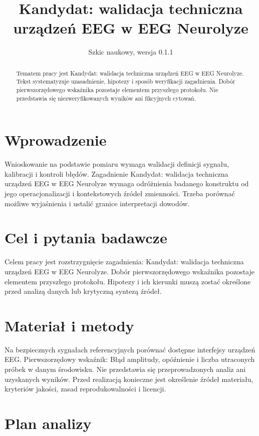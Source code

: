 \documentclass[11pt,a4paper]{article}
\title{Kandydat: walidacja techniczna urządzeń EEG w EEG Neurolyze}
\author{}
\date{Szkic naukowy, wersja 0.1.1}
\begin{document}
\maketitle

\begin{abstract}

Tematem pracy jest Kandydat: walidacja techniczna urządzeń EEG w EEG Neurolyze. Tekst systematyzuje uzasadnienie, hipotezy i sposób weryfikacji zagadnienia. Dobór pierwszorzędowego wskaźnika pozostaje elementem przyszłego protokołu. Nie przedstawia się niezweryfikowanych wyników ani fikcyjnych cytowań.

\end{abstract}

\section{Wprowadzenie}

Wnioskowanie na podstawie pomiaru wymaga walidacji definicji sygnału, kalibracji i kontroli błędów. Zagadnienie Kandydat: walidacja techniczna urządzeń EEG w EEG Neurolyze wymaga odróżnienia badanego konstruktu od jego operacjonalizacji i kontekstowych źródeł zmienności. Trzeba porównać możliwe wyjaśnienia i ustalić granice interpretacji dowodów.

\section{Cel i pytania badawcze}

Celem pracy jest rozstrzygnięcie zagadnienia: Kandydat: walidacja techniczna urządzeń EEG w EEG Neurolyze. Dobór pierwszorzędowego wskaźnika pozostaje elementem przyszłego protokołu. Hipotezy i ich kierunki muszą zostać określone przed analizą danych lub krytyczną syntezą źródeł.

\section{Materiał i metody}

Na bezpiecznych sygnałach referencyjnych porównać dostępne interfejsy urządzeń EEG. Pierwszorzędowy wskaźnik: Błąd amplitudy, opóźnienie i liczba utraconych próbek w danym środowisku. Nie przedstawia się przeprowadzonych analiz ani uzyskanych wyników. Przed realizacją konieczne jest określenie źródeł materiału, kryteriów jakości, zasad reprodukowalności i licencji.

\section{Plan analizy}
\end{document}
